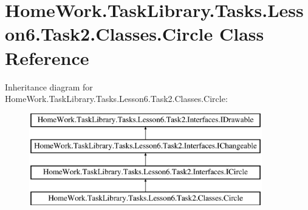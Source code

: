 \hypertarget{class_home_work_1_1_task_library_1_1_tasks_1_1_lesson6_1_1_task2_1_1_classes_1_1_circle}{}\section{Home\+Work.\+Task\+Library.\+Tasks.\+Lesson6.\+Task2.\+Classes.\+Circle Class Reference}
\label{class_home_work_1_1_task_library_1_1_tasks_1_1_lesson6_1_1_task2_1_1_classes_1_1_circle}
Inheritance diagram for Home\+Work.\+Task\+Library.\+Tasks.\+Lesson6.\+Task2.\+Classes.\+Circle\+:\begin{figure}[H]
\begin{center}
\leavevmode
\includegraphics[height=4.000000cm]{class_home_work_1_1_task_library_1_1_tasks_1_1_lesson6_1_1_task2_1_1_classes_1_1_circle}
\end{center}
\end{figure}

